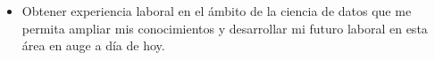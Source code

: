 


\begin{itemize}  
	\item Obtener experiencia laboral en el ámbito de la ciencia de datos que me permita ampliar mis conocimientos y desarrollar mi futuro laboral en esta área en auge a día de hoy.

\end{itemize}